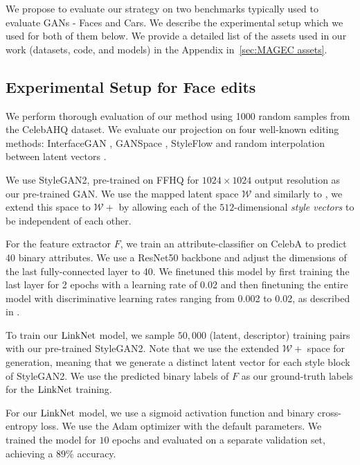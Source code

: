 We propose to evaluate our \magec strategy on two benchmarks typically 
used to evaluate \ac{GAN}s - Faces and Cars. We describe the experimental setup which we used 
for both of them below. We provide a detailed list of the assets 
used in our work (datasets, code, and models) in
the Appendix in~\ref{sec:MAGEC assets}.

\subsection{Experimental Setup for Face edits}


We perform thorough evaluation of our method using 1000 random samples from the CelebAHQ 
\citep{karras2018progressive} dataset. We evaluate our projection on four well-known editing methods: InterfaceGAN 
 \citep{shen2020}, GANSpace \citep{harkonen2020ganspace}, StyleFlow \citep{abdal2020styleflow} and random 
 interpolation between latent vectors \citep{karra2019stylegan}.

 We use StyleGAN2, pre-trained on FFHQ for $1024 \times 1024$ output resolution as our
 pre-trained GAN. We use the mapped latent space $\mathcal{W}$ and similarly to 
  \citep{abdal2019image2stylegan, abdal2020, psp, zhu2020indomain, e4e}, we extend this
   space to $\mathcal{W+}$ by allowing each of the $512$-dimensional \emph{style vectors}
    to be independent of each other. 


For the feature extractor $F$, we train an attribute-classifier
on CelebA \citep{celeba} to predict 40 binary attributes. We use a 
ResNet50 backbone \citep{he2016resnet}
and adjust the dimensions of the last fully-connected layer to 40. We finetuned 
this model by first 
training the last layer for 2 epochs with a learning rate of 0.02 and then 
finetuning 
the entire model with discriminative learning rates ranging from 0.002 to
 0.02, as described 
in \cite{howard2018universal}.
    
To train our $\mathrm{LinkNet}$ model,
we sample $50,000$ (latent, descriptor) training pairs with our pre-trained StyleGAN2. 
Note that we use the extended $\mathcal{W+}$ space for generation, meaning 
that we generate a distinct latent vector for each style block of StyleGAN2. 
We use the predicted binary labels of $F$ as our ground-truth labels for the 
$\mathrm{LinkNet}$ training.
    
For our $\mathrm{LinkNet}$ model, we use a sigmoid activation function and 
binary cross-entropy 
loss. We use 
the Adam \citep{adam} optimizer with the default parameters. We 
trained the model for $10$ epochs and evaluated on a separate validation set, 
achieving a 
$89\%$ accuracy.
    
